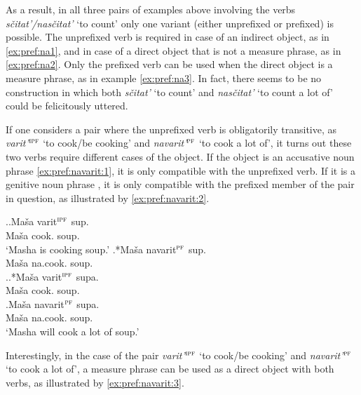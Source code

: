 As a result, in all three pairs of examples above involving the verbs \textit{s\v{c}itat'/nas\v{c}itat'} `to count' only one variant (either unprefixed or prefixed) is possible. The unprefixed verb is required in case of an indirect object, as in \ref{ex:pref:na1}, and in case of a direct object that is not a measure phrase, as in \ref{ex:pref:na2}. Only the prefixed verb can be used when the direct object is a measure phrase, as in example \ref{ex:pref:na3}. In fact, there seems to be no construction in which both \textit{s\v{c}itat'} `to count' and \textit{nas\v{c}itat'} `to count a lot of' could be felicitously uttered.

If one considers a pair where the unprefixed verb is obligatorily transitive, as \textit{varit'}$^{\textsc{ipf}}$ `to cook/be cooking' and \textit{navarit'}$^{\textsc{pf}}$ `to cook a lot of', it turns out these two verbs require different cases of the object. If the object is an accusative noun phrase  \ref{ex:pref:navarit:1}, it is only compatible with the unprefixed verb. If it is a genitive noun phrase , it is only compatible with the prefixed member of the pair in question, as illustrated by \ref{ex:pref:navarit:2}.

\ex.\label{ex:pref:navarit:1}\ag.\label{ex:varit:1}Ma\v{s}a varit$^{\textsc{ipf}}$ sup.\\
Ma\v{s}a cook. soup.\\
\trans `Masha is cooking soup.'
\bg.*Ma\v{s}a navarit$^{\textsc{pf}}$ sup.\label{ex:navarit1}\\
Ma\v{s}a na.cook. soup.\\

\ex.\label{ex:pref:navarit:2}\ag.*Ma\v{s}a varit$^{\textsc{ipf}}$ supa.\label{ex:varit2}\\
Ma\v{s}a cook. soup.\\
\bg.\label{ex:navarit2}Ma\v{s}a navarit$^{\textsc{pf}}$ supa.\\
Ma\v{s}a na.cook. soup.\\
\trans `Masha will cook a lot of soup.'

Interestingly, in the case of the pair \textit{varit'}$^{\textsc{ipf}}$ `to cook/be cooking' and \textit{navarit'}$^{\textsc{pf}}$ `to cook a lot of', a measure phrase can be used as a direct object with both verbs, as illustrated by \ref{ex:pref:navarit:3}.

